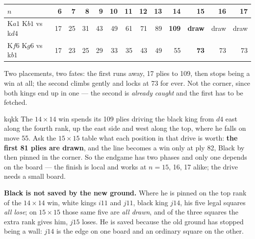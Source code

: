 \documentclass[10pt]{article}
\begin{document}
\medskip
\noindent
{}\hfill
{}\hfill
{}

\begin{center}\small
\begin{tabular}{@{}lrrrrrrrrrrrr@{}}
\toprule
$n$ & 6 & 7 & 8 & 9 & 10 & 11 & 12 & 13 & \textbf{14} & \textbf{15} & 16 & 17\\
\midrule
K$a1$ K$b1$ vs k$d4$ & 17 & 25 & 31 & 43 & 49 & 61 & 71 & 89 & \textbf{109} & \textbf{draw} & draw & draw\\
K$f6$ K$g6$ vs k$b1$ & 17 & 23 & 25 & 29 & 33 & 35 & 43 & 49 & 55 & \textbf{73} & 73 & 73\\
\bottomrule
\end{tabular}
\end{center}

\noindent
Two placements, two fates: the first runs away, 17 plies to 109, then stops
being a win at all; the second climbs gently and locks at 73 for ever. Not the
corner, since both kings end up in one --- the second is \emph{already caught}
and the first has to be fetched.

\begin{result}[title={Three quarters of the win evaporates}]{kqkk}
The $14\times14$ win spends its 109 plies driving the black king from $d4$ east
along the fourth rank, up the east side and west along the top, where he falls
on move 55. Ask the $15\times15$ table what each position in that drive is
worth: \textbf{the first 81 plies are drawn}, and the line becomes a win only
at ply 82, Black by then pinned in the corner. So the endgame has two phases
and only one depends on the board --- the finish is local and works at $n=15$,
16, 17 alike; the drive needs a small board.
\label{sub:cap-hunt-reach}
\end{result}

\noindent
\textbf{Black is not saved by the new ground.} Where he is pinned on the top
rank of the $14\times14$ win, white kings $i11$ and $j11$, black king $j14$,
his five legal squares \emph{all lose}; on $15\times15$ those same five are
\emph{all drawn}, and of the three squares the extra rank gives him, $j15$
loses. He is saved because the old ground has stopped being a wall: $j14$ is
the edge on one board and an ordinary square on the other.
\end{document}
